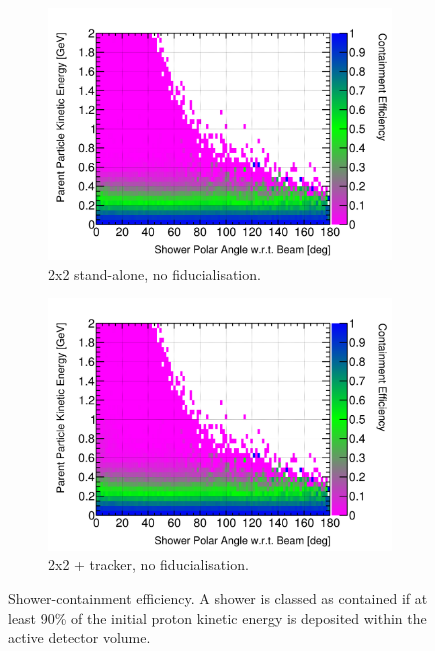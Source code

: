 \documentclass[10pt,a4paper,openany]{article}
\begin{document}
\begin{figure}[htbp]
	\centering
	\begin{subfigure}[b]{0.49\textwidth}
		\centering
		\includegraphics[width=1.0\textwidth]{P_cont_eff_2x2.png}
		\caption{2x2 stand-alone, no fiducialisation.}
		\label{}
	\end{subfigure}	
	\hfill
	\begin{subfigure}[b]{0.49\textwidth}
		\centering
		\includegraphics[width=1.0\textwidth]{P_cont_eff_2x2_Scintillator_gap.png}
		\caption{2x2 + tracker, no fiducialisation.}
		\label{}
	\end{subfigure}	
	\caption{Shower-containment efficiency. A shower is classed as contained if at least 90\% of the initial proton kinetic energy is deposited within the active detector volume.}
\end{figure}
\end{document}
